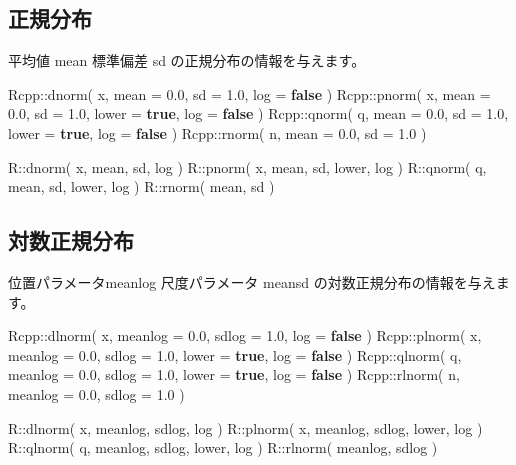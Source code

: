 \documentclass[]{book}
\newenvironment{Shaded}{\begin{snugshade}}{\end{snugshade}}
\newcommand{\FloatTok}[1]{\textcolor[rgb]{0.00,0.00,0.81}{#1}}
\newcommand{\KeywordTok}[1]{\textcolor[rgb]{0.13,0.29,0.53}{\textbf{#1}}}
\newcommand{\NormalTok}[1]{#1}
\begin{document}
\subsection{正規分布}

平均値 mean 標準偏差 sd の正規分布の情報を与えます。

\begin{Shaded}
\begin{Highlighting}[]
\NormalTok{Rcpp::dnorm( x, mean = }\FloatTok{0.0}\NormalTok{, sd = }\FloatTok{1.0}\NormalTok{, log = }\KeywordTok{false}\NormalTok{ )}
\NormalTok{Rcpp::pnorm( x, mean = }\FloatTok{0.0}\NormalTok{, sd = }\FloatTok{1.0}\NormalTok{, lower = }\KeywordTok{true}\NormalTok{, log = }\KeywordTok{false}\NormalTok{ )}
\NormalTok{Rcpp::qnorm( q, mean = }\FloatTok{0.0}\NormalTok{, sd = }\FloatTok{1.0}\NormalTok{, lower = }\KeywordTok{true}\NormalTok{, log = }\KeywordTok{false}\NormalTok{ )}
\NormalTok{Rcpp::rnorm( n, mean = }\FloatTok{0.0}\NormalTok{, sd = }\FloatTok{1.0}\NormalTok{ )}

\NormalTok{R::dnorm( x, mean, sd,        log )}
\NormalTok{R::pnorm( x, mean, sd, lower, log )}
\NormalTok{R::qnorm( q, mean, sd, lower, log )}
\NormalTok{R::rnorm(    mean, sd )}
\end{Highlighting}
\end{Shaded}

\subsection{対数正規分布}

位置パラメータmeanlog 尺度パラメータ meansd の対数正規分布の情報を与えます。

\begin{Shaded}
\begin{Highlighting}[]
\NormalTok{Rcpp::dlnorm( x, meanlog = }\FloatTok{0.0}\NormalTok{, sdlog = }\FloatTok{1.0}\NormalTok{,               log = }\KeywordTok{false}\NormalTok{ )}
\NormalTok{Rcpp::plnorm( x, meanlog = }\FloatTok{0.0}\NormalTok{, sdlog = }\FloatTok{1.0}\NormalTok{, lower = }\KeywordTok{true}\NormalTok{, log = }\KeywordTok{false}\NormalTok{ )}
\NormalTok{Rcpp::qlnorm( q, meanlog = }\FloatTok{0.0}\NormalTok{, sdlog = }\FloatTok{1.0}\NormalTok{, lower = }\KeywordTok{true}\NormalTok{, log = }\KeywordTok{false}\NormalTok{ )}
\NormalTok{Rcpp::rlnorm( n, meanlog = }\FloatTok{0.0}\NormalTok{, sdlog = }\FloatTok{1.0}\NormalTok{ )}

\NormalTok{R::dlnorm( x, meanlog, sdlog,        log )}
\NormalTok{R::plnorm( x, meanlog, sdlog, lower, log )}
\NormalTok{R::qlnorm( q, meanlog, sdlog, lower, log )}
\NormalTok{R::rlnorm(    meanlog, sdlog )}
\end{Highlighting}
\end{Shaded}
\end{document}
